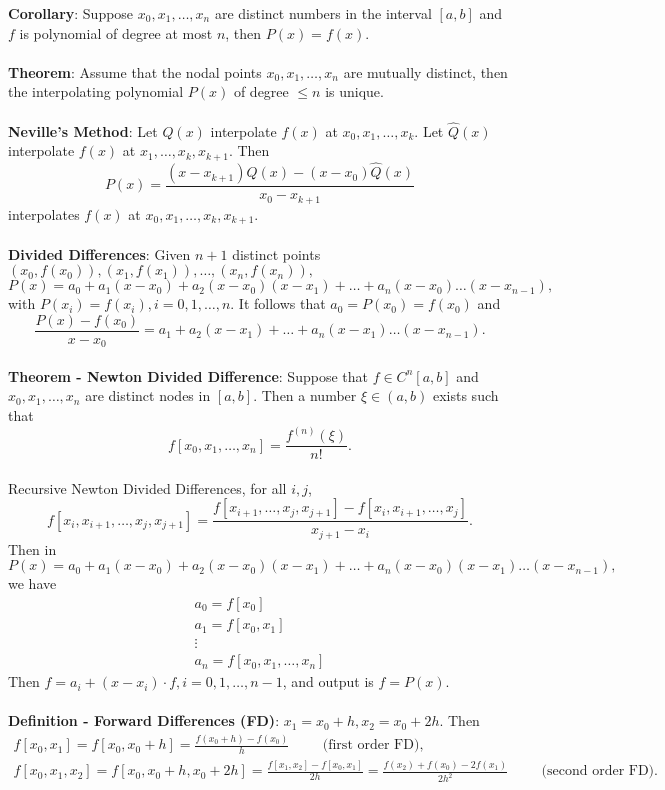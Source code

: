 \documentclass{article}
\begin{document}
\textbf{Corollary}: Suppose $x_0, x_1, \dots, x_n$ are distinct numbers in the interval $[a, b]$ and $f$ is polynomial of degree at most $n$, then
$P(x) = f(x)$. \\ \\
\textbf{Theorem}: Assume that the nodal points $x_0, x_1, \dots, x_n$ are mutually distinct, then the interpolating polynomial $P(x)$ of degree $\leq n$ is unique. \\ \\
\textbf{Neville's Method}: Let $Q(x)$ interpolate $f(x)$ at $x_0, x_1, \dots, x_k$. Let $\widehat{Q}(x)$ interpolate $f(x)$ at $x_1, \dots, x_k, x_{k + 1}$. Then $$P(x) = \frac{(x - x_{k + 1})Q(x) - (x - x_0)\widehat{Q}(x)}{x_0 - x_{k + 1}}$$ interpolates $f(x)$ at $x_0, x_1, \dots, x_k, x_{k + 1}$. \\ \\
\textbf{Divided Differences}: Given $n + 1$ distinct points $(x_0, f(x_0)), (x_1, f(x_1)), \dots, (x_n, f(x_n)),$ $$P(x) = a_0 + a_1(x - x_0) + a_2(x - x_0)(x - x_1) + \dots + a_n(x - x_0)\dots(x - x_{n - 1}),$$ with $P(x_i) = f(x_i), i = 0, 1, \dots, n$. It follows that $a_0 = P(x_0) = f(x_0)$ and $$\frac{P(x) - f(x_0)}{x - x_0} = a_1 + a_2(x - x_1) + \dots + a_n(x - x_1) \dots (x - x_{n - 1}).$$ \\
\textbf{Theorem - Newton Divided Difference}: Suppose that $f \in C^n[a, b]$ and $x_0, x_1, \dots, x_n$ are distinct nodes in $[a, b]$. Then a number $\xi \in (a, b)$ exists such that $$f[x_0, x_1, \dots, x_n] = \frac{f^{(n)}(\xi)}{n!}.$$ \\
Recursive Newton Divided Differences, for all $i, j$, $$f[x_i, x_{i + 1}, \dots, x_j, x_{j + 1}] = \frac{f[x_{i + 1}, \dots, x_j, x_{j + 1}] - f[x_i, x_{i + 1}, \dots, x_j]}{x_{j + 1} - x_i}.$$ Then in $$P(x) = a_0 + a_1(x - x_0) + a_2(x - x_0)(x - x_1) + \dots + a_n(x - x_0)(x - x_1) \dots (x - x_{n - 1}),$$ we have \begin{align*}
    a_0 = f[x_0] \\
    a_1 = f[x_0, x_1] \\
    \vdots \\
    a_n = f[x_0, x_1, \dots, x_n]
\end{align*} Then $f = a_i + (x - x_i) \cdot f, i = 0, 1, \dots, n - 1$, and output is $f = P(x)$. \\ \\
\textbf{Definition - Forward Differences (FD)}: $x_1 = x_0 + h, x_2 = x_0 + 2h$. Then \begin{align*}
    f[x_0, x_1] = f[x_0, x_0 + h] = \frac{f(x_0 + h) - f(x_0)}{h} \hspace{1cm} \text{(first order FD),} \\
    f[x_0, x_1, x_2] = f[x_0, x_0 + h, x_0 + 2h] = \frac{f[x_1, x_2] - f[x_0, x_1]}{2h} = \frac{f(x_2) + f(x_0) - 2f(x_1)}{2h^2} \hspace{1cm} \text{(second order FD).} \\
\end{align*} $ $ \\
\end{document}
